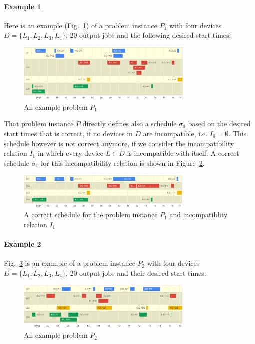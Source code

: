 \documentclass{article}
\begin{document}
\paragraph{Example 1}
Here is an example (Fig.~\ref{fig:example-problem-1}) of a problem instance $P_1$ with four devices $D = \{L_1,L_2,L_3,L_4\}$, 20 output jobs and the following desired start times:
\begin{figure}[h] 
  \centering
    \includegraphics[width=0.75\textwidth]{figures/example-problem.png}
\caption{An example problem $P_1$}
\label{fig:example-problem-1}
\end{figure}


That problem instance $P$ directly defines also a schedule $\sigma_0$ based on the desired start times that is correct, if no devices in $D$ are incompatible, i.e. $I_0 = \emptyset$. 
This schedule however is not correct anymore, if we consider the incompatibility relation $I_1$ in which every device $L \in D$ is incompatible with itself. A correct schedule $\sigma_1$ for this incompatibility relation is shown in Figure~\ref{fig:example-solution-1}.

\begin{figure}[h]
  \centering
    \includegraphics[width=0.75\textwidth]{figures/example-solution-self-incompatibility.png}
\caption{A correct schedule for the problem instance $P_1$ and incompatiblity relation $I_1$}
 \label{fig:example-solution-1}
\end{figure}


\paragraph{Example 2}
Fig.~\ref{fig:example-problem-2} is an example of a problem instance $P_2$ with four devices $D = \{L_1,L_2,L_3,L_4\}$, 20 output jobs and their desired start times.

\begin{figure}[!h]
  \centering
    \includegraphics[width=0.75\textwidth]{figures/example-problem-2.png}
\caption{An example problem $P_2$}
\label{fig:example-problem-2}
\end{figure}
\end{document}
